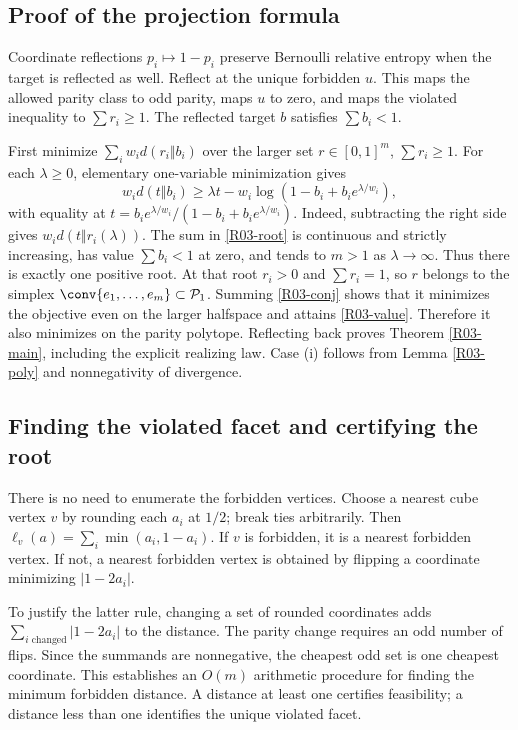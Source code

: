 \documentclass[11pt,a4paper]{article}
\theoremstyle{definition}\newtheorem{definition}[theorem]{Definition}
\theoremstyle{remark}\newtheorem{remark}[theorem]{Remark}
\numberwithin{equation}{section}
\begin{document}
\subsection{Proof of the projection formula}\label{R03-sec-3}
Coordinate reflections $p_i\mapsto1-p_i$ preserve Bernoulli relative entropy when the target is reflected as well. Reflect at the unique forbidden $u$. This maps the allowed parity class to odd parity, maps $u$ to zero, and maps the violated inequality to $\sum r_i\geq1$. The reflected target $b$ satisfies $\sum b_i<1$.

First minimize $\sum_i w_i d(r_i\Vert b_i)$ over the larger set $r\in[0,1]^m$, $\sum r_i\geq1$. For each $\lambda\geq0$, elementary one-variable minimization gives
\begin{equation}\label{R03-conj}
 w_i d(t\Vert b_i)\geq\lambda t-w_i\log(1-b_i+b_i e^{\lambda/w_i}),
\end{equation}
with equality at $t=b_i e^{\lambda/w_i}/(1-b_i+b_ie^{\lambda/w_i})$. Indeed, subtracting the right side gives $w_i d(t\Vert r_i(\lambda))$.
The sum in \eqref{R03-root} is continuous and strictly increasing, has value $\sum b_i<1$ at zero, and tends to $m>1$ as $\lambda\to\infty$. Thus there is exactly one positive root. At that root $r_i>0$ and $\sum r_i=1$, so $r$ belongs to the simplex $\conv\{e_1,\ldots,e_m\}\subset\mathcal P_1$. Summing \eqref{R03-conj} shows that it minimizes the objective even on the larger halfspace and attains \eqref{R03-value}. Therefore it also minimizes on the parity polytope. Reflecting back proves Theorem \ref{R03-main}, including the explicit realizing law. Case (i) follows from Lemma \ref{R03-poly} and nonnegativity of divergence.

\subsection{Finding the violated facet and certifying the root}\label{R03-sec-4}
There is no need to enumerate the forbidden vertices. Choose a nearest cube vertex $v$ by rounding each $a_i$ at $1/2$; break ties arbitrarily. Then $\ell_v(a)=\sum_i\min(a_i,1-a_i)$. If $v$ is forbidden, it is a nearest forbidden vertex. If not, a nearest forbidden vertex is obtained by flipping a coordinate minimizing $|1-2a_i|$.

To justify the latter rule, changing a set of rounded coordinates adds $\sum_{i\text{ changed}}|1-2a_i|$ to the distance. The parity change requires an odd number of flips. Since the summands are nonnegative, the cheapest odd set is one cheapest coordinate. This establishes an $O(m)$ arithmetic procedure for finding the minimum forbidden distance. A distance at least one certifies feasibility; a distance less than one identifies the unique violated facet.
\end{document}
